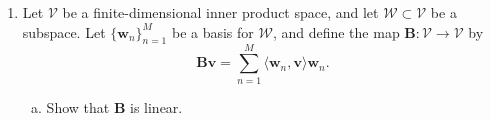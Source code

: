 \documentclass[12pt]{amsart}
\newcommand{\1}{\mathbbm{1}}
\numberwithin{equation}{section}
\numberwithin{Theorem}{section}
\theoremstyle{plain} %
\theoremstyle{definition}
\theoremstyle{remark}
\begin{document}
\begin{enumerate}[1.]
\begin{enumerate}[(a)]
\begin{proof}
\begin{enumerate}[i.]
		\item Conjugate symmetry,
		\begin{align*}
			\langle f_1(x),f_2(x)\rangle
			= \int_{-1}^{1}f_1(x)f_2(x)\,dx 
			&= \int_{-1}^{1}f_2(x)f_1(x)\,dx 
			= \langle f_2(x),f_1(x)\rangle
			\intertext{and since the domain is $\mathbb{R}$, }
			\langle f_2(x),f_1(x)\rangle
			&= \overline{\langle f_2(x),f_1(x)\rangle} .
		\end{align*}
		
		\item Positive definiteness,
		\begin{align*}
			\langle f(x),f(x)\rangle
			= \int_{-1}^{1}(f(x))^2\,dx 
			= \int_{-1}^{1}\bigg(\sum_{n=0}^{N}a_np_n(x)\bigg)^2\,dx 
		\end{align*}
		Because \((f(x))^2\) is positive on the 
		interval \([-1,1]\) when \(f(x)\neq0\) 
		the integral is also positive on that interval. 
		\vspace{-1.4em}
	\end{enumerate} 	
	\end{proof}

	\item
	A basis for \(\operatorname{span}\{p_{0}\}^\perp\)
	is \(\{b_{n}\}_{n=1}^{3}\) in which
	\begin{align*}
		b_1(x) = x, \quad
		b_2(x) = x^3, \quad
		\text{and} \quad
		b_3(x) = 3x^2-1 \quad
		\text{for all } x\in\mathbb{R}.
	\end{align*}
	
	\item
	

\end{enumerate}

\clearpage

\item Let \(\mathcal{V}\) be a finite-dimensional inner product space, and let \(\mathcal{W}\subset \mathcal{V}\) be a subspace. Let \(\{\mathbf{w}_{n}\}_{n=1}^{M}\) be a basis for \(\mathcal{W}\), and define the map \(\mathbf{B}:\mathcal{V}\to\mathcal{V}\) by
\[\mathbf{B}\mathbf{v} = \sum_{n=1}^{M}\langle \mathbf{w}_{n},\mathbf{v}\rangle \mathbf{w}_{n}.\]\medskip

\begin{enumerate}[(a)]

\item Show that \(\mathbf{B}\) is linear.\medskip


\end{enumerate}
\end{enumerate}
\end{document}
